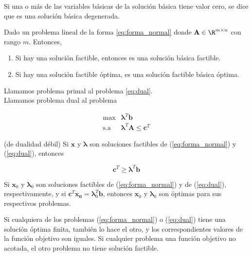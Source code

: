 \begin{defi}
Si una o más de las variables básicas de la solución básica tiene valor cero, se dice que es una solución básica degenerada.
\end{defi}

\begin{teo}
Dado un problema lineal de la forma \ref{eq:forma_normal} donde $\mathbf{A} \in \R^{m \times n}$ con rango $m$. Entonces,

\begin{enumerate}
\item Si hay una solución factible, entonces es una solución básica factible.
\item Si hay una solución factible óptima, es una solución factible básica óptima.
\end{enumerate}
\end{teo}

\begin{defi}
Llamamos problema primal al problema \ref{eq:dual}.\\

Llamamos problema dual al problema 

\begin{equation} \label{eq:dual}
\begin{array}{rl}
\mathrm{max} & \mathbf{\boldsymbol\lambda}^T \mathbf{b}\\
\mathrm{s.a} & \mathbf{\boldsymbol\lambda}^T \mathbf{A} \leq \mathbf{c}^T 
\end{array}
\end{equation} 
\end{defi}

\begin{lema}(de dualidad débil)
Si $\mathbf{x}$ y $\mathbf{\boldsymbol\lambda}$ son soluciones factibles de (\ref{eq:forma_normal}) y (\ref{eq:dual}), entonces

\[ \mathbf{c}^T \geq \mathbf{\boldsymbol\lambda}^T \mathbf{b} \]
\end{lema}

\begin{cor}
Si $\mathbf{x}_0$ y $\mathbf{\boldsymbol\lambda}_0$ son soluciones factibles de (\ref{eq:forma_normal}) y de (\ref{eq:dual}), respectivamente, y si $\mathbf{c}^T \mathbf{x_0} = \mathbf{\boldsymbol\lambda}_0^T \mathbf{b}$, entonces $\mathbf{x}_0$ y $\mathbf{\boldsymbol\lambda}_0$ son óptimas para sus respectivos problemas.
\end{cor}

\begin{teo}
Si cualquiera de los problemas (\ref{eq:forma_normal}) o (\ref{eq:dual}) tiene una solución óptima finita, también lo hace el otro, y los correspondientes valores de la función objetivo son iguales. Si cualquier problema una función objetivo no acotada, el otro problema no tiene solución factible.  
\end{teo}
